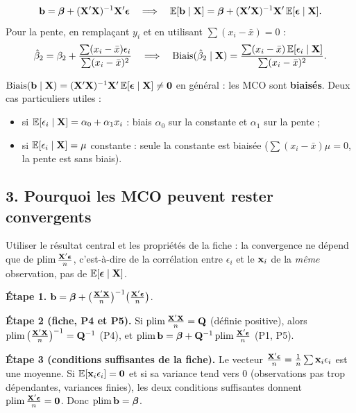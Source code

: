 \documentclass[11pt,a4paper]{article}
\newcommand{\vbeta}{\bm{\beta}}\newcommand{\veps}{\bm{\epsilon}}\newcommand{\Q}{\mathbf{Q}}
\newcommand{\E}{\mathbb{E}}\newcommand{\Var}{\operatorname{Var}}\newcommand{\Cov}{\operatorname{Cov}}
\newcommand{\plim}{\operatorname{plim}}
\begin{document}
\[
\vb=\vbeta+(\vX'\vX)^{-1}\vX'\veps\quad\Longrightarrow\quad
\E[\vb\mid\vX]=\vbeta+(\vX'\vX)^{-1}\vX'\,\E[\veps\mid\vX] .
\]
Pour la pente, en remplaçant $y_i$ et en utilisant $\sum(x_i-\bar x)=0$ :
\[
\hat\beta_2=\beta_2+\frac{\sum(x_i-\bar x)\epsilon_i}{\sum(x_i-\bar x)^2}
\quad\Longrightarrow\quad
\text{Biais}(\hat\beta_2\mid\vX)=\frac{\sum(x_i-\bar x)\,\E[\epsilon_i\mid\vX]}{\sum(x_i-\bar x)^2}.
\]

\begin{reponse}
$\text{Biais}(\vb\mid\vX)=(\vX'\vX)^{-1}\vX'\,\E[\veps\mid\vX]\neq\mathbf 0$ en général : les MCO sont \textbf{biaisés}. Deux cas particuliers utiles :
\begin{itemize}[nosep]
\item si $\E[\epsilon_i\mid\vX]=\alpha_0+\alpha_1x_i$ : biais $\alpha_0$ sur la constante et $\alpha_1$ sur la pente ;
\item si $\E[\epsilon_i\mid\vX]=\mu$ constante : seule la constante est biaisée ($\sum(x_i-\bar x)\mu=0$, la pente est sans biais).
\end{itemize}
\end{reponse}

\subsection*{3. Pourquoi les MCO peuvent rester convergents}

\begin{idee}
Utiliser le résultat central et les propriétés de la fiche : la convergence ne dépend que de $\plim\frac{\vX'\veps}{n}$, c'est-à-dire de la corrélation entre $\epsilon_i$ et le $\mathbf{x}_i$ de la \emph{même} observation, pas de $\E[\veps\mid\vX]$.
\end{idee}

\textbf{Étape 1.} $\vb=\vbeta+\big(\frac{\vX'\vX}{n}\big)^{-1}\big(\frac{\vX'\veps}{n}\big)$.

\textbf{Étape 2 (fiche, P4 et P5).} Si $\plim\frac{\vX'\vX}{n}=\Q$ (définie positive), alors $\plim\big(\frac{\vX'\vX}{n}\big)^{-1}=\Q^{-1}$ (P4), et $\plim\vb=\vbeta+\Q^{-1}\plim\frac{\vX'\veps}{n}$ (P1, P5).

\textbf{Étape 3 (conditions suffisantes de la fiche).} Le vecteur $\frac{\vX'\veps}{n}=\frac1n\sum\vx_i\epsilon_i$ est une moyenne. Si $\E[\vx_i\epsilon_i]=\mathbf 0$ et si sa variance tend vers 0 (observations pas trop dépendantes, variances finies), les deux conditions suffisantes donnent $\plim\frac{\vX'\veps}{n}=\mathbf 0$. Donc $\plim\vb=\vbeta$.
\end{document}
